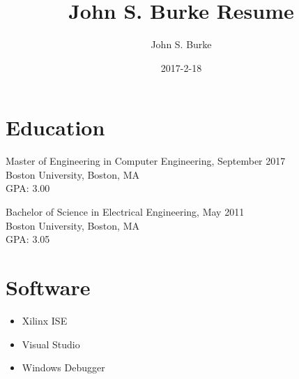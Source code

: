 \documentclass[11pt,letterpaper]{res}
\title{John S. Burke Resume}
\date{2017-2-18}
\author{John S. Burke}
\begin{document}
\address{123 Fake Street \\ Badger, TX 1179 \\ (555) 555-5555}

\begin{resume}
\section{Education}
Master of Engineering in Computer Engineering, September 2017 \\
Boston University, Boston, MA \\
GPA: 3.00

Bachelor of Science in Electrical Engineering, May 2011 \\
Boston University, Boston, MA \\
GPA: 3.05

\section{Software}
\begin{itemize}
\item Xilinx ISE
\item Visual Studio
\item Windows Debugger
\end{itemize}

\end{resume}
\end{document}
